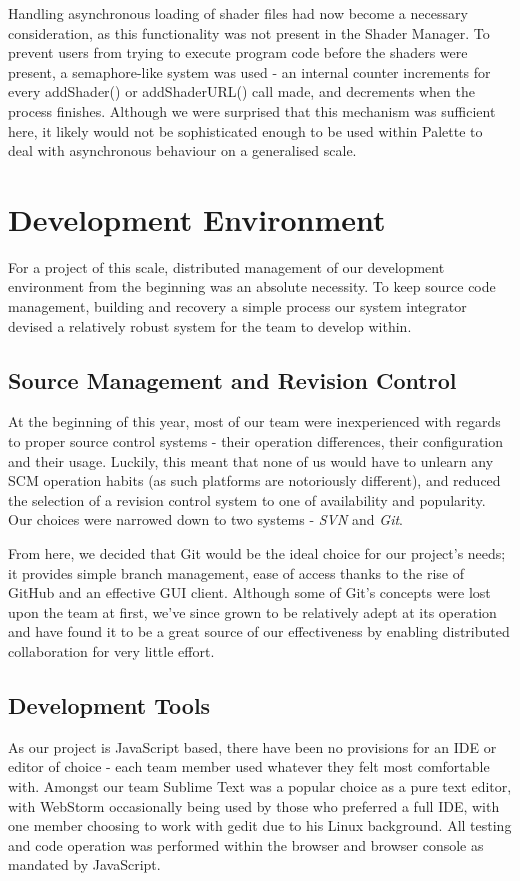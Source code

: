 \documentclass{l3proj}
\begin{document}
Handling asynchronous loading of shader files had now become a necessary consideration, as this functionality was not present in the Shader Manager. To prevent users from trying to execute program code before the shaders were present, a semaphore-like system was used - an internal counter increments for every addShader() or addShaderURL() call made, and decrements when the process finishes. Although we were surprised that this mechanism was sufficient here, it likely would not be sophisticated enough to be used within Palette to deal with asynchronous behaviour on a generalised scale.
\chapter{Development Environment}
\label{dev}
For a project of this scale, distributed management of our development environment from the beginning was an absolute necessity. To keep source code management, building and recovery a simple process our system integrator devised a relatively robust system for the team to develop within.
\section{Source Management and Revision Control}
\label{dev-scm}
At the beginning of this year, most of our team were inexperienced with regards to proper source control systems - their operation differences, their configuration and their usage. Luckily, this meant that none of us would have to unlearn any SCM operation habits (as such platforms are notoriously different), and reduced the selection of a revision control system to one of availability and popularity. Our choices were narrowed down to two systems - \textit{SVN} and \textit{Git}.

From here, we decided that Git would be the ideal choice for our project's needs; it provides simple branch management, ease of access thanks to the rise of GitHub and an effective GUI client. Although some of Git's concepts were lost upon the team at first, we've since grown to be relatively adept at its operation and have found it to be a great source of our effectiveness by enabling distributed collaboration for very little effort.

\section{Development Tools}
\label{dev-tools}
As our project is JavaScript based, there have been no provisions for an IDE or editor of choice - each team member used whatever they felt most comfortable with. Amongst our team Sublime Text was a popular choice as a pure text editor, with WebStorm occasionally being used by those who preferred a full IDE, with one member choosing to work with gedit due to his Linux background. All testing and code operation was performed within the browser and browser console as mandated by JavaScript.
\end{document}
